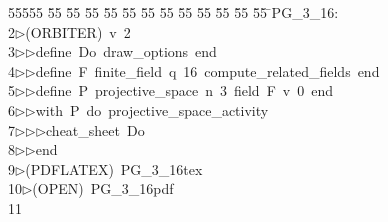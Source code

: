 %
%
\begin{tabbing}
55555 \= 55 \= 55 \= 55 \= 55 \= 55 \= 55 \= 55 \= 55 \= 55 \= 55 \= 55 \= 55 \= \>PG\_3\_16:\\[0pt]
2\>$\triangleright$\>(ORBITER)\ v\ 2\ \\[0pt]
3\>$\triangleright$\>$\triangleright$\>define\ Do\ draw\_options\ end\ \\[0pt]
4\>$\triangleright$\>$\triangleright$\>define\ F\ finite\_field\ q\ 16\ compute\_related\_fields\ end\ \\[0pt]
5\>$\triangleright$\>$\triangleright$\>define\ P\ projective\_space\ n\ 3\ field\ F\ v\ 0\ end\ \\[0pt]
6\>$\triangleright$\>$\triangleright$\>with\ P\ do\ projective\_space\_activity\ \\[0pt]
7\>$\triangleright$\>$\triangleright$\>$\triangleright$\>cheat\_sheet\ Do\ \\[0pt]
8\>$\triangleright$\>$\triangleright$\>end\\[0pt]
9\>$\triangleright$\>(PDFLATEX)\ PG\_3\_16tex\ \\[0pt]
10\>$\triangleright$\>(OPEN)\ PG\_3\_16pdf\\[0pt]
11\>\end{tabbing}
